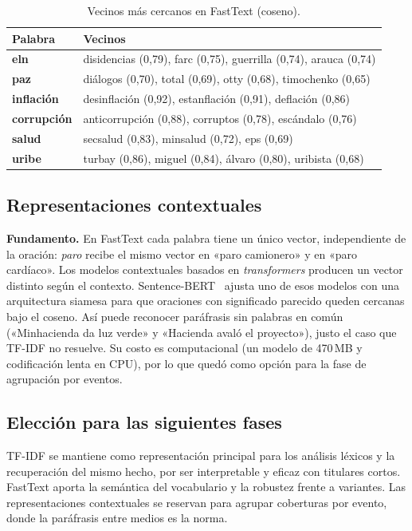 \documentclass[10pt,twocolumn]{article}
\begin{document}
\begin{table}[t]
\centering\small
\caption{Vecinos más cercanos en FastText (coseno).}
\label{tab:ft}
\begin{tabular}{>{\bfseries}l p{5.2cm}}
\toprule
\textnormal{\textbf{Palabra}} & \textbf{Vecinos}\\
\midrule
eln & disidencias (0,79), farc (0,75), guerrilla (0,74), arauca (0,74)\\
paz & diálogos (0,70), total (0,69), otty (0,68), timochenko (0,65)\\
inflación & desinflación (0,92), estanflación (0,91), deflación (0,86)\\
corrupción & anticorrupción (0,88), corruptos (0,78), escándalo (0,76)\\
salud & secsalud (0,83), minsalud (0,72), eps (0,69)\\
uribe & turbay (0,86), miguel (0,84), álvaro (0,80), uribista (0,68)\\
\bottomrule
\end{tabular}
\end{table}

\subsection{Representaciones contextuales}

\textbf{Fundamento.} En FastText cada palabra tiene un único vector,
independiente de la oración: \textit{paro} recibe el mismo vector en
«paro camionero» y en «paro cardíaco». Los modelos contextuales basados en
\textit{transformers} producen un vector distinto según el contexto.
Sentence-BERT~\cite{reimers2019} ajusta uno de esos modelos con una
arquitectura siamesa para que oraciones con significado parecido queden
cercanas bajo el coseno. Así puede reconocer paráfrasis sin palabras en común
(«Minhacienda da luz verde» y «Hacienda avaló el proyecto»), justo el caso que
TF-IDF no resuelve. Su costo es computacional (un modelo de 470\,MB y
codificación lenta en CPU), por lo que quedó como opción para la fase de
agrupación por eventos.

\subsection{Elección para las siguientes fases}

TF-IDF se mantiene como representación principal para los análisis léxicos y
la recuperación del mismo hecho, por ser interpretable y eficaz con titulares
cortos. FastText aporta la semántica del vocabulario y la robustez frente a
variantes. Las representaciones contextuales se reservan para agrupar
coberturas por evento, donde la paráfrasis entre medios es la norma.
\end{document}
